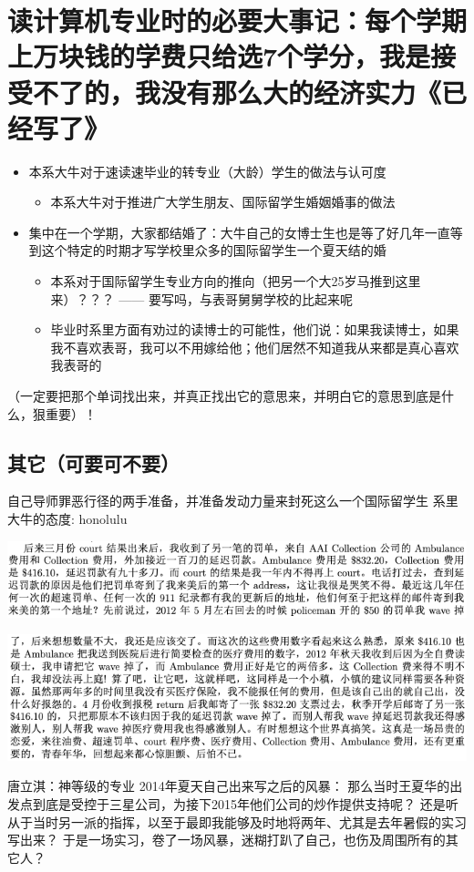 \documentclass[9pt, b5paper]{article}
\begin{document}
\section{读计算机专业时的必要大事记：每个学期上万块钱的学费只给选7个学分，我是接受不了的，我没有那么大的经济实力《已经写了》}
\label{sec:orgaba91f1}
\begin{itemize}
\item 本系大牛对于速读速毕业的转专业（大龄）学生的做法与认可度
\begin{itemize}
\item 本系大牛对于推进广大学生朋友、国际留学生婚姻婚事的做法
\end{itemize}
\item 集中在一个学期，大家都结婚了：大牛自己的女博士生也是等了好几年一直等到这个特定的时期才写学校里众多的国际留学生一个夏天结的婚
\begin{itemize}
\item 本系对于国际留学生专业方向的推向（把另一个大25岁马推到这里来）？？？ —— 要写吗，与表哥舅舅学校的比起来呢
\item 毕业时系里方面有劝过的读博士的可能性，他们说：如果我读博士，如果我不喜欢表哥，我可以不用嫁给他；他们居然不知道我从来都是真心喜欢我表哥的
\end{itemize}
\end{itemize}
（一定要把那个单词找出来，并真正找出它的意思来，并明白它的意思到底是什么，狠重要）！
\subsection{其它（可要可不要）}
\label{sec:org4d6a228}
自己导师罪恶行径的两手准备，并准备发动力量来封死这么一个国际留学生
系里大牛的态度: honolulu
\begin{center}
\includegraphics[width=.9\linewidth]{./pic/backups_plans_20210424_215120.png}
\end{center}
\begin{center}
\includegraphics[width=.9\linewidth]{./pic/backups_plans_20210424_215147.png}
\end{center}
唐立淇：神等级的专业
2014年夏天自己出来写之后的风暴：
那么当时王夏华的出发点到底是受控于三星公司，为接下2015年他们公司的炒作提供支持呢？
还是听从于当时另一派的指挥，以至于最即我能够及时地将两年、尤其是去年暑假的实习写出来？
于是一场实习，卷了一场风暴，迷糊打趴了自己，也伤及周围所有的其它人？
\end{document}
